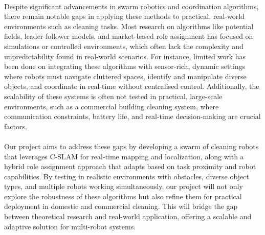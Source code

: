 \paragraph*{}
Despite significant advancements in swarm robotics and coordination algorithms, there remain notable gaps in applying these methods to practical, real-world environments such as cleaning tasks. Most research on algorithms like potential fields, leader-follower models, and market-based role assignment has focused on simulations or controlled environments, which often lack the complexity and unpredictability found in real-world scenarios. For instance, limited work has been done on integrating these algorithms with sensor-rich, dynamic settings where robots must navigate cluttered spaces, identify and manipulate diverse objects, and coordinate in real-time without centralised control. Additionally, the scalability of these systems is often not tested in practical, large-scale environments, such as a commercial building cleaning system, where communication constraints, battery life, and real-time decision-making are crucial factors.

\paragraph*{}
Our project aims to address these gaps by developing a swarm of cleaning robots that leverages C-SLAM for real-time mapping and localization, along with a hybrid role assignment approach that adapts based on task proximity and robot capabilities. By testing in realistic environments with obstacles, diverse object types, and multiple robots working simultaneously, our project will not only explore the robustness of these algorithms but also refine them for practical deployment in domestic and commercial cleaning. This will bridge the gap between theoretical research and real-world application, offering a scalable and adaptive solution for multi-robot systems.
